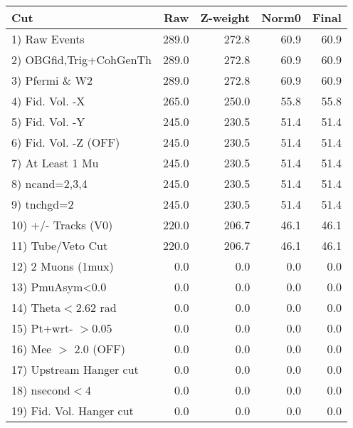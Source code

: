  \begin{table}[h!]\centering
 \begin{tabular}{||l||r|r|r|r||}
 \hline
 \hline
 Cut & Raw & Z-weight & Norm0 & Final \\
 \hline
  1) Raw Events           &       289.0 &       272.8 &        60.9 &        60.9 \\
  2) OBGfid,Trig+CohGenTh &       289.0 &       272.8 &        60.9 &        60.9 \\
  3) Pfermi \& W2         &       289.0 &       272.8 &        60.9 &        60.9 \\
  4) Fid. Vol. -X         &       265.0 &       250.0 &        55.8 &        55.8 \\
  5) Fid. Vol. -Y         &       245.0 &       230.5 &        51.4 &        51.4 \\
  6) Fid. Vol. -Z (OFF)   &       245.0 &       230.5 &        51.4 &        51.4 \\
  7) At Least 1 Mu        &       245.0 &       230.5 &        51.4 &        51.4 \\
  8) ncand=2,3,4          &       245.0 &       230.5 &        51.4 &        51.4 \\
  9) tnchgd=2             &       245.0 &       230.5 &        51.4 &        51.4 \\
 10) +/- Tracks (V0)      &       220.0 &       206.7 &        46.1 &        46.1 \\
 11) Tube/Veto Cut        &       220.0 &       206.7 &        46.1 &        46.1 \\
 12) 2 Muons (1mux)       &         0.0 &         0.0 &         0.0 &         0.0 \\
 13) PmuAsym<0.0          &         0.0 &         0.0 &         0.0 &         0.0 \\
 14) Theta$<$2.62 rad     &         0.0 &         0.0 &         0.0 &         0.0 \\
 15) Pt+wrt- $>$0.05      &         0.0 &         0.0 &         0.0 &         0.0 \\
 16) Mee $>$ 2.0  (OFF)   &         0.0 &         0.0 &         0.0 &         0.0 \\
 17) Upstream Hanger cut  &         0.0 &         0.0 &         0.0 &         0.0 \\
 18) nsecond$<$4          &         0.0 &         0.0 &         0.0 &         0.0 \\
 19) Fid. Vol. Hanger cut &         0.0 &         0.0 &         0.0 &         0.0 \\

\end{tabular}
\end{table}
